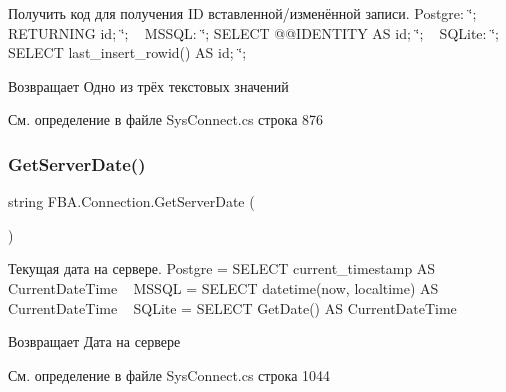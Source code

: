Получить код для получения ID вставленной/изменённой записи. Postgre\+: \char`\"{}; R\+E\+T\+U\+R\+N\+I\+N\+G id; \char`\"{}; ~\newline
M\+S\+S\+QL\+: \char`\"{}; S\+E\+L\+E\+C\+T @@\+I\+D\+E\+N\+T\+I\+T\+Y A\+S id; \char`\"{}; ~\newline
S\+Q\+Lite\+: \char`\"{}; S\+E\+L\+E\+C\+T last\+\_\+insert\+\_\+rowid() A\+S id; \char`\"{}; 

\begin{DoxyReturn}{Возвращает}
Одно из трёх текстовых значений
\end{DoxyReturn}


См. определение в файле Sys\+Connect.\+cs строка 876

\mbox{\label{class_f_b_a_1_1_connection_a55e0e003b04b9ee54c49e47a6cebf0b4}} 
\subsubsection{\texorpdfstring{Get\+Server\+Date()}{GetServerDate()}}
{\footnotesize\ttfamily string F\+B\+A.\+Connection.\+Get\+Server\+Date (\begin{DoxyParamCaption}{ }\end{DoxyParamCaption})}



Текущая дата на сервере. Postgre = S\+E\+L\+E\+CT current\+\_\+timestamp AS Current\+Date\+Time ~\newline
M\+S\+S\+QL = S\+E\+L\+E\+CT datetime(\textquotesingle{}now\textquotesingle{}, \textquotesingle{}localtime\textquotesingle{}) AS Current\+Date\+Time ~\newline
S\+Q\+Lite = S\+E\+L\+E\+CT Get\+Date() AS Current\+Date\+Time 

\begin{DoxyReturn}{Возвращает}
Дата на сервере
\end{DoxyReturn}


См. определение в файле Sys\+Connect.\+cs строка 1044

\mbox{\label{class_f_b_a_1_1_connection_a9d5433bfc95420f963f932439dd5a838}} 
